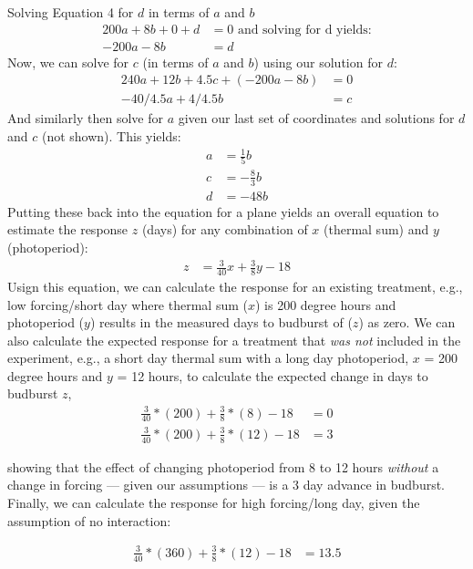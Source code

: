 \documentclass[11pt]{article}
\begin{document}
Solving Equation 4 for $d$ in terms of $a$ and $b$
\begin{align}
200a + 8b + 0 + d & = 0 \text{ and solving for d yields:} \\
-200a - 8b & =  d  %
\end{align}
Now, we can solve for $c$ (in terms of $a$ and $b$) using our solution for $d$:
\begin{align}
240a+12b+4.5c+(-200a - 8b) & = 0\\
-40/4.5a+4/4.5b & = c%
\end{align}
And similarly then solve for $a$ given our last set of coordinates and solutions for $d$ and $c$ (not shown). This yields:
\begin{align}
a & =\frac{1}{5}b\\
c & =-\frac{8}{3}b\\
d & =-48b
\end{align}
Putting these back into the equation for a plane yields an overall equation to estimate the response $z$ (days) for any combination of $x$ (thermal sum) and $y$ (photoperiod):
\begin{align}
z & = \frac{3}{40}x + \frac{3}{8}y-18
\end{align}
Usign this equation, we can calculate the response for an existing treatment, e.g., low forcing/short day where thermal sum ($x$) is 200 degree hours and photoperiod ($y$) results in the measured days to budburst of ($z$) as zero.  We can also calculate the expected response for a treatment that \textit{was not} included in the experiment, e.g., a short day thermal sum with a long day photoperiod, $x$ = 200 degree hours and $y$ = 12 hours, to calculate the expected change in days to budburst $z$,
\begin{align}
\frac{3}{40}*(200) + \frac{3}{8}*(8)-18 &=0\\ 
\frac{3}{40}*(200) + \frac{3}{8}*(12)-18 &=3 
\end{align}

showing that the effect of changing photoperiod from 8 to 12 hours \textit{without} a change in forcing --- given our assumptions --- is a 3 day advance in budburst.\\ 

Finally, we can calculate the response for high forcing/long day, given the assumption of no interaction:
 
\begin{align}
\frac{3}{40}*(360) + \frac{3}{8}*(12)-18 &=13.5
\end{align}
\end{document}
